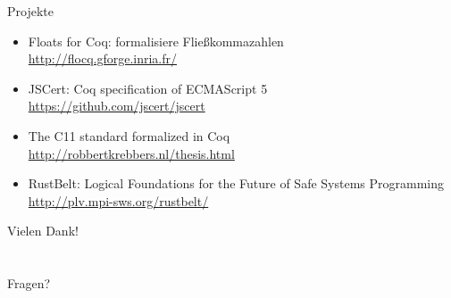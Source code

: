 \documentclass[aspectratio=169]{beamer}
\begin{document}
\begin{frame}
  \begin{center}
    \Large{Projekte}
  \end{center}
  \begin{itemize}
  \item Floats for Coq: formalisiere Fließkommazahlen\\
    \qquad \url{http://flocq.gforge.inria.fr/}
  \item JSCert: Coq specification of ECMAScript 5\\
    \qquad \url{https://github.com/jscert/jscert}
  \item The C11 standard formalized in Coq\\
    \qquad \url{http://robbertkrebbers.nl/thesis.html}
  \item RustBelt: Logical Foundations for the Future of Safe Systems Programming\\
    \qquad \url{http://plv.mpi-sws.org/rustbelt/}
  \end{itemize}
\end{frame}
\begin{frame}
  \begin{center}
    \Huge{Vielen Dank!}\\
    ~\\
    ~\\
    \Large{Fragen?}
  \end{center}
\end{frame}
\end{document}
